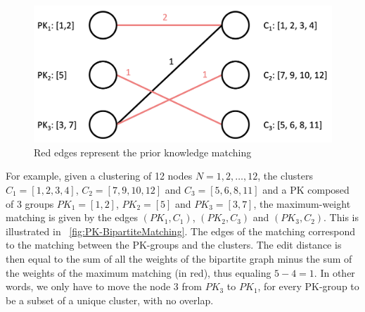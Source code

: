 


\begin{figure}[!ht]
\centering
\includegraphics[width=0.7\linewidth]{static/figures/PK-Clustering/VISPaperFigures/bipartiteMatching.png}
\caption{Red edges represent the prior knowledge matching}
\label{fig:PK-BipartiteMatching}
\end{figure}


For example, given a clustering of 12 nodes $N = {1,2, \ldots, 12}$, the clusters $C_1 = [1,2,3,4]$, $C_2 = [7,9,10,12]$ and $C_3 = [5,6,8,11]$ and a PK composed of 3 groups $PK_1 = [1,2]$, $PK_2 = [5]$ and $PK_3 = [3,7]$, the maximum-weight matching is given by the edges $(PK_1, C_1)$, $(PK_2, C_3)$ and $(PK_3, C_2)$. This is illustrated in ~\autoref{fig:PK-BipartiteMatching}. The edges of the matching correspond to the matching between the PK-groups and the clusters. The edit distance is then equal to the sum of all the weights of the bipartite graph minus the sum of the weights of the maximum matching (in red), thus equaling $5 - 4 = 1$. In other words, we only have to move the node 3 from $PK_3$ to $PK_1$, for every PK-group to be a subset of a unique cluster, with no overlap.


